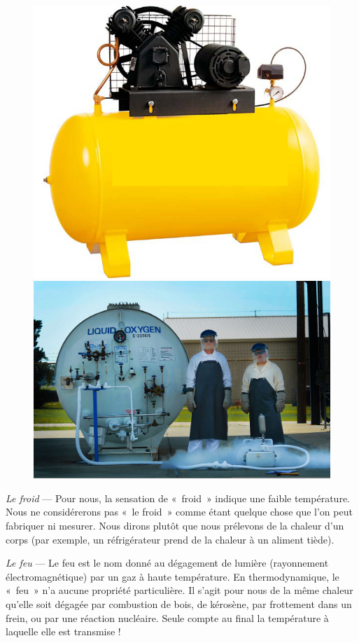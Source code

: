 \begin{description}
		\begin{figure}
			\begin{center}
			\includegraphics[height=0.38\textwidth]{images/air_piston_compressor.jpg}
			\includegraphics[height=0.38\textwidth]{images/liquid_oxygen_expansion.jpg}
			\end{center}
			\label{fig_chauffer_refroidir}
		\end{figure}
			
			\item \textit{Le froid} --- Pour nous, la sensation de «~froid~» indique une faible température. Nous ne considérerons pas «~le froid~» comme étant quelque chose que l’on peut fabriquer ni mesurer. Nous dirons plutôt que nous prélevons de la chaleur d’un corps (par exemple, un réfrigérateur prend de la chaleur à un aliment tiède).
			
			\item \textit{Le feu} --- Le feu est le nom donné au dégagement de lumière (rayonnement électromagnétique) par un gaz à haute température. En thermodynamique, le «~feu~» n’a aucune propriété particulière. Il s’agit pour nous de la même chaleur qu’elle soit dégagée par combustion de bois, de kérosène, par frottement dans un frein, ou par une réaction nucléaire. Seule compte au final la température à laquelle elle est transmise !
			\end{description}

